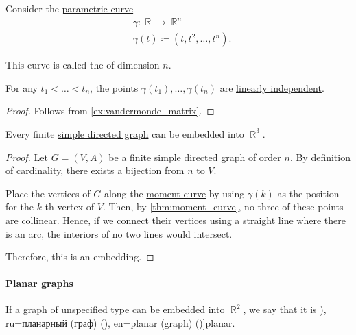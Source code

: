 \begin{proposition}\label{thm:moment_curve}
  Consider the \hyperref[def:parametric_curve]{parametric curve}
  \begin{equation*}
    \begin{aligned}
      &\gamma: \BbbR \to \BbbR^n \\
      &\gamma(t) \coloneqq (t, t^2, \ldots, t^n).
    \end{aligned}
  \end{equation*}

  This curve is called the  of dimension \( n \).

  For any \( t_1 < \ldots < t_n \), the points \( \gamma(t_1), \ldots, \gamma(t_n) \) are \hyperref[def:linear_dependence]{linearly independent}.
\end{proposition}
\begin{proof}
  Follows from \cref{ex:vandermonde_matrix}.
\end{proof}

\begin{proposition}\label{thm:directed_multigraph_can_be_embedded_into_r3}
  Every finite \hyperref[def:directed_graph]{simple directed graph} can be embedded into \( \BbbR^3 \).
\end{proposition}
\begin{proof}
  Let \( G = (V, A) \) be a finite simple directed graph of order \( n \). By definition of cardinality, there exists a bijection from \( n \) to \( V \).

  Place the vertices of \( G \) along the \hyperref[thm:moment_curve]{moment curve} by using \( \gamma(k) \) as the position for the \( k \)-th vertex of \( V \). Then, by \cref{thm:moment_curve}, no three of these points are \hyperref[def:collinear_points]{collinear}. Hence, if we connect their vertices using a straight line where there is an arc, the interiors of no two lines would intersect.

  Therefore, this is an embedding.
\end{proof}

\paragraph{Planar graphs}

\begin{definition}\label{def:planar_graph}
  If a \hyperref[rem:graph_of_unspecified_type]{graph of unspecified type} can be embedded into \( \BbbR^2 \), we say that it is \term[bg=планарен (граф) (\cite[129]{Мирчев2001Графи}), ru=планарный (граф) (\cite[150]{ЕмеличевИПр1990ТеорияГрафов}), en=planar (graph) (\cite[89]{Diestel2017GraphTheory})]{planar}.
\end{definition}

